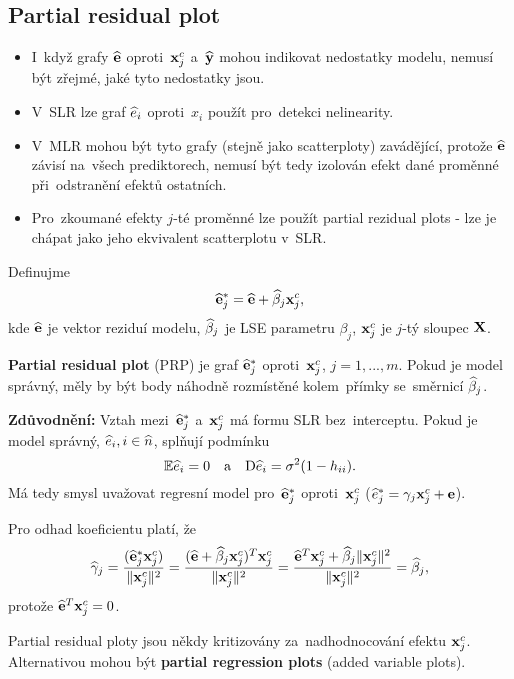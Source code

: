 \subsection{Partial residual plot}
\begin{itemize}
\item I~když grafy $\widehat{\mathbf{e}}$ oproti~$\mathbf{x}_j^c$ a~$\widehat{\mathbf{y}}$ mohou indikovat nedostatky modelu, nemusí být zřejmé, jaké tyto nedostatky jsou.
\item V~SLR lze graf $\widehat{e}_i$ oproti~$x_i$ použít pro~detekci nelinearity.
\item V~MLR mohou být tyto grafy (stejně jako scatterploty) zavádějící, protože $\widehat{\mathbf{e}}$ závisí na~všech prediktorech, nemusí být tedy izolován efekt dané proměnné při~odstranění efektů ostatních.
\item Pro~zkoumané efekty $j$-té proměnné lze použít partial rezidual plots - lze je chápat jako jeho ekvivalent scatterplotu v~SLR.
\end{itemize}

\begin{define}
Definujme
$$
   \widehat{\mathbf{e}}_j^* = \widehat{\mathbf{e}} + \widehat{\beta}_j \mathbf{x}_j^c,
$$
 kde $\widehat{\mathbf{e}}$ je vektor reziduí modelu, $\widehat{\beta}_j$ je LSE parametru $\beta_j$, $\mathbf{x}_j^c$ je $j$-tý sloupec $\mathbf{X}$.
\end{define}

\textbf{Partial residual plot} (PRP) je graf $\widehat{\mathbf{e}}_j^*$ oproti~$\mathbf{x}_j^c$, $j = 1,..., m$. Pokud je model správný, měly by být body náhodně rozmístěné kolem~přímky se~směrnicí $\widehat{\beta}_j$.

\textbf{Zdůvodnění:} Vztah mezi~$\widehat{\mathbf{e}}_j^*$ a~$\mathbf{x}_j^c$ má formu SLR bez~interceptu. Pokud je model správný, $\widehat{e}_i, i\in\widehat{n} $, splňují podmínku
$$\mathbb{E} \widehat{e}_i = 0 \quad \text{a} \quad \mathrm{D} \widehat{e}_i = \sigma^2(1 - h_{ii}).$$
Má tedy smysl uvažovat regresní model pro~$\widehat{\mathbf{e}}_j^*$ oproti~$\mathbf{x}_j^c$ ($\widehat{e}_j^* = \gamma_j \mathbf{x}_j^c + \mathbf{e}$).

\newcommand{\hg}{\widehat{\gamma}}

Pro odhad koeficientu platí, že
 $$
\hg_j = \frac{(\heb_j^* \x_j^c)}{\norm{\x_j^c}^2} = \frac{(\heb + \wbeta_j \x_j^c)^T \x_j^c}{\norm{\x_j^c}^2} = \frac{\heb^T \x_j^c + \wbeta_j \norm{\x_j^c}^2}{\norm{\x_j^c}^2} = \wbeta_j,
 $$
protože $\widehat{\mathbf{e}}^T \mathbf{x}_j^c = 0$.


\newcommand{\wb}{\mathbf{w}}
\newcommand{\Xmj}{\X_{(-j)}}
\newcommand{\Xmi}{\X_{(-i)}}

\begin{remark}
	Partial residual ploty jsou někdy kritizovány za~nadhodnocování efektu $\mathbf{x}_j^c$. Alternativou mohou být \textbf{partial regression plots} (added variable plots).
\end{remark}

